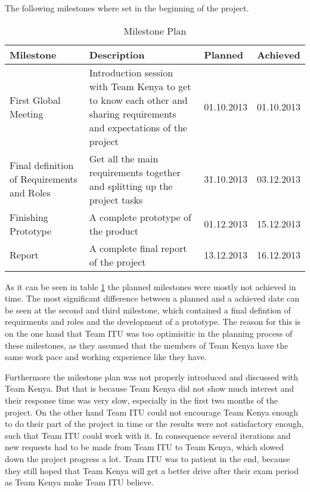 The following milestones where set in the beginning of the project.

\begin{table}[htb]
	\centering
	\begin{tabular}{ |  p{4cm} |  p{6cm} | l | l |}
    		\hline
   		Milestone & Description & Planned & Achieved \\ \hline
    		First Global Meeting & Introduction session with Team Kenya to get to know each other and sharing requirements and expectations of the project & 01.10.2013 & 01.10.2013 \\ \hline
    		Final definition of Requirements and Roles & Get all the main requirements together and splitting up the project tasks & 31.10.2013 & 03.12.2013 \\ \hline
    		Finishing Prototype & A complete prototype of the product & 01.12.2013 & 15.12.2013\\ \hline
		Report & A complete final report of the project & 13.12.2013 & 16.12.2013\\ \hline
	\end{tabular}
	\caption{Milestone Plan}
	\label{tab:milestones_table}
\end{table}

As it can be seen in table \ref{tab:milestones_table} the planned milestones were mostly not achieved in time. The most significant difference between a planned and a achieved date can be seen at the second and third milestone, which contained a final defintion of requirments and roles and the development of a prototype. The reason for this is on the one hand that Team ITU was too optimisitic in the planning process of these milestones, as they assumed that the members of Team Kenya have the same work pace and working experience like they have.

Furthermore the milestone plan was not properly introduced and discussed with Team Kenya. But that is because Team Kenya did not show much interest and their response time was very slow, especially in the first two months of the project. On the other hand Team ITU could not encourage Team Kenya enough to do their part of the project in time or the results were not satisfactory enough, such that Team ITU could work with it. In consequence several iterations and new requests had to be made from Team ITU to Team Kenya, which slowed down the project progress a lot. Team ITU was to patient in the end, because they still hoped that Team Kenya will get a better drive after their exam period as Team Kenya make Team ITU believe.

